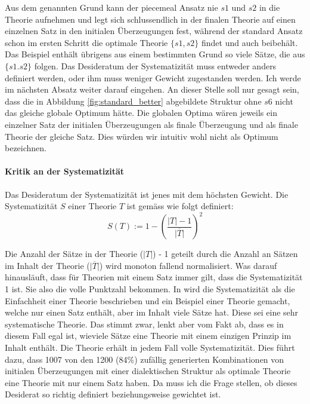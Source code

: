 \documentclass{article}
\begin{document}
Aus dem genannten Grund kann der piecemeal Ansatz nie $s1$ und $s2$ in die Theorie aufnehmen und legt sich schlussendlich in der finalen Theorie auf einen einzelnen Satz in den initialen Überzeugungen fest, während der standard Ansatz schon im ersten Schritt die optimale Theorie $\{s1, s2\}$ findet und auch beibehält. Das Beispiel enthält übrigens aus einem bestimmten Grund so viele Sätze, die aus $\{s1. s2\}$ folgen. Das Desideratum der Systematizität muss entweder anders definiert werden, oder ihm muss weniger Gewicht zugestanden werden. Ich werde im nächsten Absatz weiter darauf eingehen. An dieser Stelle soll nur gesagt sein, dass die in Abbildung \ref{fig:standard_better} abgebildete Struktur ohne $s6$ nicht das gleiche globale Optimum hätte. Die globalen Optima wären jeweils ein einzelner Satz der initialen Überzeugungen als finale Überzeugung und als finale Theorie der gleiche Satz. Dies würden wir intuitiv wohl nicht als Optimum bezeichnen.

\paragraph{Kritik an der Systematizität}
Das Desideratum der Systematizität ist jenes mit dem höchsten Gewicht. Die Systematizität $S$ einer Theorie $T$ ist gemäss \autocite[S. 465]{beisbart_making_2021} wie folgt definiert:
$$
S(T) := 1- \left(\frac{\lvert T \rvert -1}{\lvert \overline{T} \rvert}\right)^2
$$

Die Anzahl der Sätze in der Theorie ($\lvert T \rvert$) - 1 geteilt durch die Anzahl an Sätzen im Inhalt der Theorie ($\lvert \overline{T} \rvert$) wird monoton fallend normalisiert. Was darauf hinausläuft, dass für Theorien mit einem Satz immer gilt, dass die Systematizität 1 ist. Sie also die volle Punktzahl bekommen. In \autocite[S.~447]{beisbart_making_2021} wird die Systematizität als die Einfachheit einer Theorie beschrieben und ein Beispiel einer Theorie gemacht, welche nur einen Satz enthält, aber im Inhalt viele Sätze hat. Diese sei eine sehr systematische Theorie. Das stimmt zwar, lenkt aber vom Fakt ab, dass es in diesem Fall egal ist, wieviele Sätze eine Theorie mit einem einzigen Prinzip im Inhalt enthält. Die Theorie erhält in jedem Fall volle Systematizität. Dies führt dazu, dass 1007 von den 1200 (84\%) zufällig generierten Kombinationen von initialen Überzeugungen mit einer dialektischen Struktur als optimale Theorie eine Theorie mit nur einem Satz haben. Da muss ich die Frage stellen, ob dieses Desiderat so richtig definiert beziehungsweise gewichtet ist.
\end{document}
